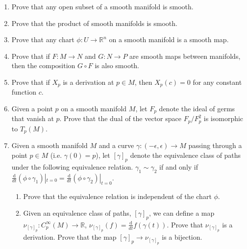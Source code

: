 \begin{enumerate}
    \item Prove that any open subset of a smooth manifold is smooth.
    \item Prove that the product of smooth manifolds is smooth.
  \item Prove that any chart $\phi : U \to \mathbb{R}^n$ on a smooth manifold is a smooth map.
\item Prove that if $F : M \to N$ and $G : N \to P$ are smooth maps between manifolds, then the composition $G \circ F$ is also smooth.
  \item Prove that if $X_p$ is a derivation at $p\in M$, then $X_p(c)=0$ for any constant function $c$.
    \item Given a point $p$ on a smooth manifold $M$, let $F_p$ denote the ideal of germs that vanish at $p$. Prove that the dual of the vector space $F_p / F_p^2$ is isomorphic to $T_p(M)$.
    \item Given a smooth manifold $M$ and a curve $\gamma : (-\epsilon, \epsilon) \to M$ passing through a point $p \in M$ (i.e. $\gamma(0)=p$), let  $\left[\gamma\right]_p$ denote the equivalence class of paths under the following equivalence relation. $\gamma_1 \sim \gamma_2$ if and only if  $\frac{\mathrm{d}}{dt} (\phi \circ \gamma_1)|_{t=0}=\frac{\mathrm{d}}{dt} (\phi \circ \gamma_2)|_{t=0}$.
      \begin{enumerate}
\item Prove that the equivalence relation is independent of the chart $\phi$.
\item Given an equivalence class of paths, $\left[\gamma\right]_p$, we can define a map $\nu_{\left[\gamma\right]_p} : C_p^\infty(M) \to \mathbb{R}$, $\nu_{\left[\gamma\right]_p}(f) = \frac{\mathrm{d}}{dt} f(\gamma(t))$.
Prove that $\nu_{\left[\gamma\right]_p}$ is a derivation. 
Prove that the map $\left[\gamma\right]_p \to \nu_{\left[\gamma\right]_p}$ is a bijection.
      \end{enumerate}
\end{enumerate}


